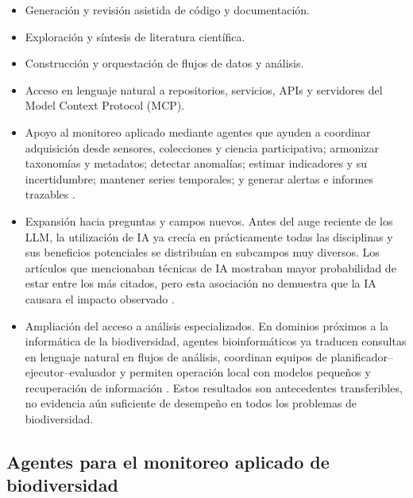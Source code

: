 \documentclass[11pt,a4paper]{article}
\begin{document}
\begin{itemize}
  \item Generación y revisión asistida de código y documentación.
  \item Exploración y síntesis de literatura científica.
  \item Construcción y orquestación de flujos de datos y análisis.
  \item Acceso en lenguaje natural a repositorios, servicios, APIs y servidores
  del Model Context Protocol (MCP).
  \item Apoyo al monitoreo aplicado mediante agentes que ayuden a coordinar
  adquisición desde sensores, colecciones y ciencia participativa; armonizar
  taxonomías y metadatos; detectar anomalías; estimar indicadores y su
  incertidumbre; mantener series temporales; y generar alertas e informes
  trazables  \citep{paton2009biodiversity,buckland2005monitoring,feng2022databases}.
  \item Expansión hacia preguntas y campos nuevos. Antes del auge reciente de los
  LLM, la utilización de IA ya crecía en prácticamente todas las disciplinas y
  sus beneficios potenciales se distribuían en subcampos muy diversos. Los
  artículos que mencionaban técnicas de IA mostraban mayor probabilidad de estar
  entre los más citados, pero esta asociación no demuestra que la IA causara el
  impacto observado \citep{gao2024quantifying}.
  \item Ampliación del acceso a análisis especializados. En dominios próximos a
  la informática de la biodiversidad, agentes bioinformáticos ya traducen
  consultas en lenguaje natural en flujos de análisis, coordinan equipos de
  planificador--ejecutor--evaluador y permiten operación local con modelos
  pequeños y recuperación de información
  \citep{xin2024bia,xiao2024cellagent,mehandru2025bioagents}. Estos resultados son
  antecedentes transferibles, no evidencia aún suficiente de desempeño en todos
  los problemas de biodiversidad.
\end{itemize}

\subsection{Agentes para el monitoreo aplicado de biodiversidad}
\end{document}
